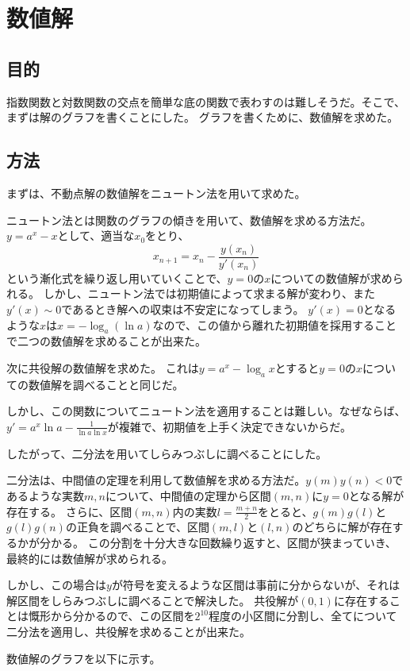 \section{数値解}

\subsection{目的}

指数関数と対数関数の交点を簡単な底の関数で表わすのは難しそうだ。そこで、まずは解のグラフを書くことにした。
グラフを書くために、数値解を求めた。

\subsection{方法}
まずは、不動点解の数値解をニュートン法を用いて求めた。

ニュートン法とは関数のグラフの傾きを用いて、数値解を求める方法だ。$y=a^x-x$として、適当な$x_0$をとり、
\[
	x_{n+1} = x_n - \frac{y(x_n)}{y'(x_n)}
\]
という漸化式を繰り返し用いていくことで、$y=0$の$x$についての数値解が求められる。
しかし、ニュートン法では初期値によって求まる解が変わり、また$y'(x) \sim 0$であるとき解への収束は不安定になってしまう。
$y'(x) = 0$となるような$x$は$x = -\log_{a} \left(\ln{a}\right)$なので、この値から離れた初期値を採用することで二つの数値解を求めることが出来た。

次に共役解の数値解を求めた。
これは$y = a^{x} - \log_{a} x$とすると$y=0$の$x$についての数値解を調べることと同じだ。

しかし、この関数についてニュートン法を適用することは難しい。なぜならば、$y' = a^{x}\ln{a} - \frac{1}{\ln{a}\ln{x}}$が複雑で、初期値を上手く決定できないからだ。

したがって、二分法を用いてしらみつぶしに調べることにした。

二分法は、中間値の定理を利用して数値解を求める方法だ。$y(m)y(n) < 0$であるような実数$m,n$について、中間値の定理から区間$(m,n)$に$y = 0$となる解が存在する。
さらに、区間$(m,n)$内の実数$l = \frac{m+n}{2}$をとると、$g(m)g(l)$と$g(l)g(n)$の正負を調べることで、区間$(m,l)$と$(l,n)$のどちらに解が存在するかが分かる。
この分割を十分大きな回数繰り返すと、区間が狭まっていき、最終的には数値解が求められる。

しかし、この場合は$y$が符号を変えるような区間は事前に分からないが、それは解区間をしらみつぶしに調べることで解決した。
共役解が$(0,1)$に存在することは慨形から分かるので、この区間を$2^{10}$程度の小区間に分割し、全てについて二分法を適用し、共役解を求めることが出来た。

数値解のグラフを以下に示す。

